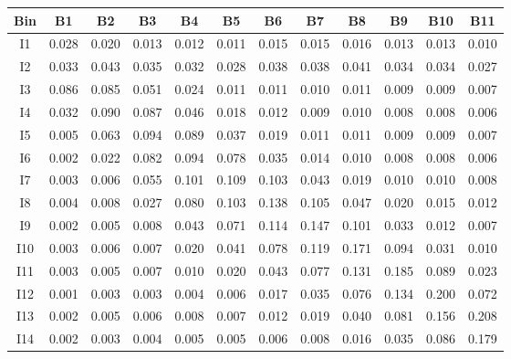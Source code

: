 \begin{tabular}{c@{~~~}c@{~~}c@{~~}c@{~~}c@{~~}c@{~~}c@{~~}c@{~~}c@{~~}c@{~~}c@{~~}c}
\hline 
 \hline 
Bin	& B1 & B2 & B3 & B4 & B5 & B6 & B7 & B8 & B9 & B10 & B11 \\ 
\hline 
I1	&  0.028 &  0.020 &  0.013 &  0.012 &  0.011 &  0.015 &  0.015 &  0.016 &  0.013 &  0.013 &  0.010 \\  
I2	&  0.033 &  0.043 &  0.035 &  0.032 &  0.028 &  0.038 &  0.038 &  0.041 &  0.034 &  0.034 &  0.027 \\  
I3	&  0.086 &  0.085 &  0.051 &  0.024 &  0.011 &  0.011 &  0.010 &  0.011 &  0.009 &  0.009 &  0.007 \\  
I4	&  0.032 &  0.090 &  0.087 &  0.046 &  0.018 &  0.012 &  0.009 &  0.010 &  0.008 &  0.008 &  0.006 \\  
I5	&  0.005 &  0.063 &  0.094 &  0.089 &  0.037 &  0.019 &  0.011 &  0.011 &  0.009 &  0.009 &  0.007 \\  
I6	&  0.002 &  0.022 &  0.082 &  0.094 &  0.078 &  0.035 &  0.014 &  0.010 &  0.008 &  0.008 &  0.006 \\  
I7	&  0.003 &  0.006 &  0.055 &  0.101 &  0.109 &  0.103 &  0.043 &  0.019 &  0.010 &  0.010 &  0.008 \\  
I8	&  0.004 &  0.008 &  0.027 &  0.080 &  0.103 &  0.138 &  0.105 &  0.047 &  0.020 &  0.015 &  0.012 \\  
I9	&  0.002 &  0.005 &  0.008 &  0.043 &  0.071 &  0.114 &  0.147 &  0.101 &  0.033 &  0.012 &  0.007 \\  
I10	&  0.003 &  0.006 &  0.007 &  0.020 &  0.041 &  0.078 &  0.119 &  0.171 &  0.094 &  0.031 &  0.010 \\  
I11	&  0.003 &  0.005 &  0.007 &  0.010 &  0.020 &  0.043 &  0.077 &  0.131 &  0.185 &  0.089 &  0.023 \\  
I12	&  0.001 &  0.003 &  0.003 &  0.004 &  0.006 &  0.017 &  0.035 &  0.076 &  0.134 &  0.200 &  0.072 \\  
I13	&  0.002 &  0.005 &  0.006 &  0.008 &  0.007 &  0.012 &  0.019 &  0.040 &  0.081 &  0.156 &  0.208 \\  
I14	&  0.002 &  0.003 &  0.004 &  0.005 &  0.005 &  0.006 &  0.008 &  0.016 &  0.035 &  0.086 &  0.179 \\  
\hline 
 \hline 
\end{tabular}